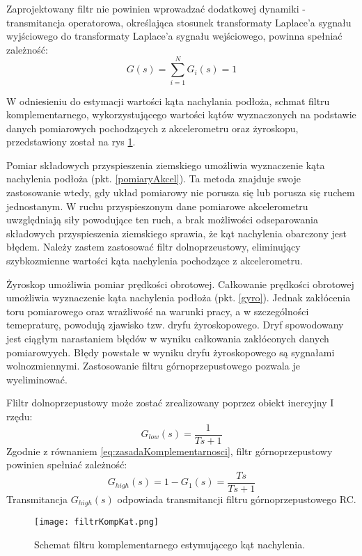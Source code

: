 Zaprojektowany filtr nie powinien wprowadzać dodatkowej dynamiki - transmitancja operatorowa, określająca stosunek transformaty Laplace'a sygnału wyjściowego do transformaty Laplace'a sygnału wejściowego, powinna spełniać zależność:
\begin{equation}
    G(s)=\sum_{i=1}^{N}G_{i}(s)=1
    \label{eq:zasadaKomplementarnosci}
\end{equation}

W odniesieniu do estymacji wartości kąta nachylania podłoża, schmat filtru komplementarnego, wykorzystującego wartości kątów wyznaczonych na podstawie danych pomiarowych pochodzących z akcelerometru oraz żyroskopu, przedstawiony został na rys \ref{fig:kompKat}. 

Pomiar składowych przyspieszenia ziemskiego umożliwia wyznaczenie kąta nachylenia podłoża (pkt. \ref{pomiaryAkcel}). Ta metoda znajduje swoje zastosowanie wtedy, gdy układ pomiarowy nie porusza się lub porusza się ruchem jednostanym. W ruchu przyspieszonym dane pomiarowe akcelerometru uwzględniają siły powodujące ten ruch, a brak możliwości odseparowania składowych przyspieszenia ziemskiego sprawia, że kąt nachylenia obarczony jest błędem. Należy zastem zastosować filtr dolnoprzeustowy, eliminujący szybkozmienne wartości kąta nachylenia pochodzące z akcelerometru.

Żyroskop umożliwia pomiar prędkości obrotowej. Całkowanie prędkości obrotowej umożliwia wyznaczenie kąta nachylenia podłoża (pkt. \ref{gyro}). Jednak zakłócenia toru pomiarowego oraz wrażliwość na warunki pracy, a w szczególności temepraturę, powodują zjawisko tzw. dryfu żyroskopowego. Dryf spowodowany jest ciągłym narastaniem błędów w wyniku całkowania zakłóconych danych pomiarowyych. Błędy powstałe w wyniku dryfu żyroskopowego są sygnałami wolnozmiennymi. Zastosowanie filtru górnoprzepustowego pozwala je wyeliminować. 

Fliltr dolnoprzepustowy może zostać zrealizowany poprzez obiekt inercyjny I rzędu:
\begin{equation}
    G_{low}(s)=\frac{1}{Ts+1}
    \label{eq:lowPass}
\end{equation}
Zgodnie z równaniem \ref{eq:zasadaKomplementarnosci}, filtr górnoprzepustowy powinien spełniać zależność:
\begin{equation}
    G_{high}(s)=1-G_{1}(s)=\frac{Ts}{Ts+1}
    \label{eq:highPass}
\end{equation}
Transmitancja $G_{high}(s)$ odpowiada transmitancji filtru górnoprzepustowego RC.

\begin{figure}[h]
    \centering
    \texttt{[image: filtrKompKat.png]}
    \caption{Schemat filtru komplementarnego estymującego kąt nachylenia.}
    \label{fig:kompKat}
\end{figure}

